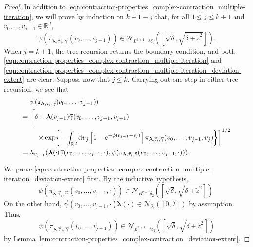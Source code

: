 \documentclass[11pt]{article}
\newcommand{\R}{\mathbb R}
\newcommand{\bl}{\bm{\lambda}}
\newcommand{\tz}{\tilde{z}}
\numberwithin{equation}{section}
\theoremstyle{plain}
\theoremstyle{definition}
\theoremstyle{remark}
\begin{document}
\begin{proof}
In addition to \eqref{eqn:contraction-properties_complex-contraction_multiple-iteration}, we will prove by induction on $k+1-j$ that, for all $1\le j\le k+1$ and $v_{0},\dots,v_{j-1}\in\R^{d}$,
\begin{equation}
\label{eqn:contraction-properties_complex-contraction_multiple-iteration_deviation-extent}
\psi(\pi_{\bl,\vec{\tau}_{i},\vec{\gamma}}(v_{0},\dots,v_{j-1}))\in\mathcal{N}_{B^{k+1-j}\delta_{2}}([\sqrt{\delta},\sqrt{\delta+\tz^{2}}]).
\end{equation}
When $j=k+1$, the tree recursion returns the boundary condition, and both \eqref{eqn:contraction-properties_complex-contraction_multiple-iteration} and \eqref{eqn:contraction-properties_complex-contraction_multiple-iteration_deviation-extent} are clear.
Suppose now that $j\le k$.
Carrying out one step in either tree recursion, we see that
\begin{equation}
\begin{split}
{}&\psi(\pi_{\bl,\vec{\tau}_{i},\vec{\gamma}}(v_{0},\dots,v_{j-1}))
\\
={}&
\begin{multlined}[t]
\left[\delta+\bl(v_{j-1})\vec{\gamma}(v_{0},\dots,v_{j-1},v_{j-1})
\vphantom{\times\exp{-\int_{\R^{d}}\dd{v}_{j}\left[1-e^{-\phi(v_{j-1}-v_{j})}\right]\pi_{\bl,\vec{\tau}_{i},\vec{\gamma}}(v_{0},\dots,v_{j-1},v_{j})}}
\right.
\\
\left.\times\exp{-\int_{\R^{d}}\dd{v}_{j}\left[1-e^{-\phi(v_{j-1}-v_{j})}\right]\pi_{\bl,\vec{\tau}_{i},\vec{\gamma}}(v_{0},\dots,v_{j-1},v_{j})}\right]^{1/2}
\end{multlined}
\\
={}&h_{v_{j-1}}(\bl(\cdot)\vec{\gamma}(v_{0},\dots,v_{j-1},\cdot),\psi(\pi_{\bl,\vec{\tau}_{i},\vec{\gamma}}(v_{0},\dots,v_{j-1},\cdot))).
\end{split}
\end{equation}

We prove \eqref{eqn:contraction-properties_complex-contraction_multiple-iteration_deviation-extent} first.
By the inductive hypothesis, 
\begin{equation}
\psi(\pi_{\bl,\vec{\tau}_{i},\vec{\gamma}}(v_{0},\dots,v_{j-1},\cdot))\in\mathcal{N}_{B^{k-j}\delta_{2}}([\sqrt{\delta},\sqrt{\delta+\tz^{2}}]).
\end{equation}
On the other hand, $\vec{\gamma}(v_{0},\dots,v_{j-1},\cdot)\bl(\cdot)\in\mathcal{N}_{\delta_{1}}([0,\lambda])$ by assumption.
Thus, 
\begin{equation}
\psi(\pi_{\bl,\vec{\tau}_{i},\vec{\gamma}}(v_{0},\dots,v_{j-1}))\in\mathcal{N}_{B^{k+1-j}\delta_{2}}([\sqrt{\delta},\sqrt{\delta+\tz^{2}}])
\end{equation}
by Lemma \ref{lem:contraction-properties_complex-contraction_deviation-extent}.


\end{proof}
\end{document}
